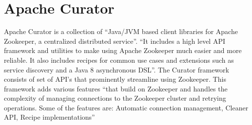 \section{Apache Curator}

Apache Curator is a collection of ``Java/JVM based client libraries for
Apache Zookeeper, a centralized distributed
service''\cite{hid-sp18-514-apachecurator}.  ``It includes a high level
API framework and utilities to make using Apache Zookeeper much easier
and more reliable.  It also includes recipes for common use cases and
extensions such as service discovery and a Java 8 asynchronous
DSL''\cite{hid-sp18-514-apachecurator}.  The Curator framework consists
of set of API’s that prominently streamline using Zookeeper.  This
framework adds various features ``that build on Zookeeper and handles
the complexity of managing connections to the Zookeeper cluster and
retrying operations.  Some of the features are: Automatic connection
management, Cleaner API, Recipe
implementations''\cite{hid-sp18-514-apachecuratorfeatures}
